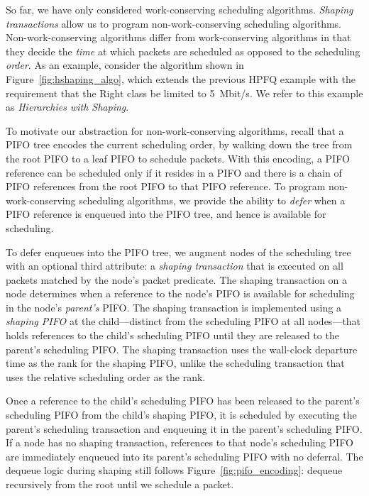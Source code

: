 So far, we have only considered work-conserving scheduling
algorithms. {\em Shaping transactions} allow us to program
non-work-conserving scheduling algorithms. Non-work-conserving
algorithms differ from work-conserving algorithms in that they decide
the {\em time} at which packets are scheduled as opposed to the
scheduling {\em order}. As an example, consider the algorithm shown in
Figure~\ref{fig:hshaping_algo}, which extends the previous HPFQ
example with the requirement that the Right class be limited to
5~Mbit/s. We refer to this example as {\em Hierarchies with Shaping}.


To motivate our abstraction for non-work-conserving algorithms, recall
that a PIFO tree encodes the current scheduling order, by walking down
the tree from the root PIFO to a leaf PIFO to schedule packets.  With
this encoding, a PIFO reference can be scheduled
only if it resides in a PIFO and there is a chain of PIFO references
from the root PIFO to that PIFO reference. To program non-work-conserving
scheduling algorithms, we provide the ability to {\em defer} when a
PIFO reference is enqueued into the PIFO tree, and hence is
available for scheduling.

To defer enqueues into the PIFO tree, we augment nodes of the
scheduling tree with an optional third attribute: a {\em shaping
  transaction} that is executed on all packets matched by the node's
packet predicate. The shaping transaction on a node determines when a
reference to the node's PIFO is available for scheduling in the node's
{\em parent's} PIFO. The shaping transaction is implemented using a
{\em shaping PIFO} at the child---distinct from the scheduling PIFO at
all nodes---that holds references to the child's scheduling PIFO until
they are released to the parent's scheduling PIFO.  The shaping
transaction uses the wall-clock departure time as the rank for the
shaping PIFO, unlike the scheduling transaction that uses the relative
scheduling order as the rank.

Once a reference to the child's scheduling PIFO has been released to
the parent's scheduling PIFO from the child's shaping PIFO, it is
scheduled by executing the parent's scheduling transaction and
enqueuing it in the parent's scheduling PIFO. If a node has no shaping
transaction, references to that node's scheduling PIFO are
immediately enqueued into its parent's scheduling PIFO with no deferral.
The dequeue logic during shaping still follows Figure~\ref{fig:pifo_encoding}:
dequeue recursively from the root until we schedule a packet.


